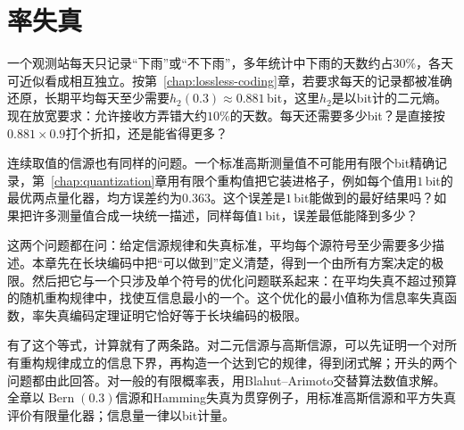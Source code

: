 \chapter{率失真}
\label{chap:rate-distortion}

一个观测站每天只记录“下雨”或“不下雨”，多年统计中下雨的天数约占$30\%$，各天可近似看成相互独立。按第~\ref{chap:lossless-coding}章，若要求每天的记录都被准确还原，长期平均每天至少需要$h_2(0.3)\approx0.881$\,bit，这里$h_2$是以bit计的二元熵。现在放宽要求：允许接收方弄错大约$10\%$的天数。每天还需要多少bit？是直接按$0.881\times0.9$打个折扣，还是能省得更多？

连续取值的信源也有同样的问题。一个标准高斯测量值不可能用有限个bit精确记录，第~\ref{chap:quantization}章用有限个重构值把它装进格子，例如每个值用$1$\,bit的最优两点量化器，均方误差约为$0.363$。这个误差是$1$\,bit能做到的最好结果吗？如果把许多测量值合成一块统一描述，同样每值$1$\,bit，误差最低能降到多少？

这两个问题都在问：给定信源规律和失真标准，平均每个源符号至少需要多少描述。本章先在长块编码中把“可以做到”定义清楚，得到一个由所有方案决定的极限。然后把它与一个只涉及单个符号的优化问题联系起来：在平均失真不超过预算的随机重构规律中，找使互信息最小的一个。这个优化的最小值称为信息率失真函数，率失真编码定理证明它恰好等于长块编码的极限。

有了这个等式，计算就有了两条路。对二元信源与高斯信源，可以先证明一个对所有重构规律成立的信息下界，再构造一个达到它的规律，得到闭式解；开头的两个问题都由此回答。对一般的有限概率表，用Blahut–Arimoto交替算法数值求解。全章以$\operatorname{Bern}(0.3)$信源和Hamming失真为贯穿例子，用标准高斯信源和平方失真评价有限量化器；信息量一律以bit计量。












